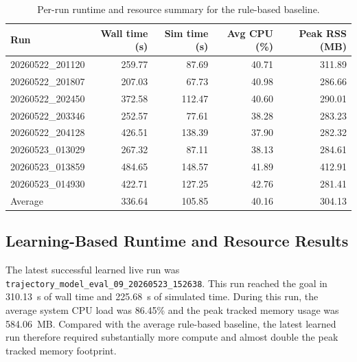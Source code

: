 \begin{table}[tbp]
    \caption{Per-run runtime and resource summary for the rule-based baseline.}
    \label{tab:rule_based_runtime_runs}
    \centering
    \scriptsize
    \setlength{\tabcolsep}{3pt}
    \renewcommand{\arraystretch}{1.10}
    \begin{tabular}{@{}lrrrr@{}}
        \toprule
        \textbf{Run} & \textbf{Wall time (s)} & \textbf{Sim time (s)} & \textbf{Avg CPU (\%)} & \textbf{Peak RSS (MB)} \\
        \midrule
        20260522\_201120 & 259.77 & 87.69 & 40.71 & 311.89 \\
        20260522\_201807 & 207.03 & 67.73 & 40.98 & 286.66 \\
        20260522\_202450 & 372.58 & 112.47 & 40.60 & 290.01 \\
        20260522\_203346 & 252.57 & 77.61 & 38.28 & 283.23 \\
        20260522\_204128 & 426.51 & 138.39 & 37.90 & 282.32 \\
        20260523\_013029 & 267.32 & 87.11 & 38.13 & 284.61 \\
        20260523\_013859 & 484.65 & 148.57 & 41.89 & 412.91 \\
        20260523\_014930 & 422.71 & 127.25 & 42.76 & 281.41 \\
        \midrule
        Average & 336.64 & 105.85 & 40.16 & 304.13 \\
        \bottomrule
    \end{tabular}
\end{table}

\subsection{Learning-Based Runtime and Resource Results}

The latest successful learned live run was \texttt{trajectory\_model\_eval\_09\_20260523\_152638}. This run reached the goal in 310.13~s of wall time and 225.68~s of simulated time. During this run, the average system CPU load was 86.45\% and the peak tracked memory usage was 584.06~MB. Compared with the average rule-based baseline, the latest learned run therefore required substantially more compute and almost double the peak tracked memory footprint.

